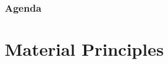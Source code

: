 

\def\PresTitle{Hardness}  %
\def\PresSubtitle{Gauges and Measurement}         %
\def\PresAuthor{Brad Peirson}               %
\def\PresInstitute{College of Information Technology and Engineering}       %
\def\PresDate{}                             %
\def\PresKeywords{}                         %





\maketitle              %

\begin{frame}
    \frametitle{Agenda}
    \begingroup
        \setlength{\parskip}{0.3em} 
        
        
        \setcounter{tocdepth}{1} %
    \tableofcontents
    \setcounter{tocdepth}{2} %
    \endgroup
\end{frame}

\section{Material Principles}

